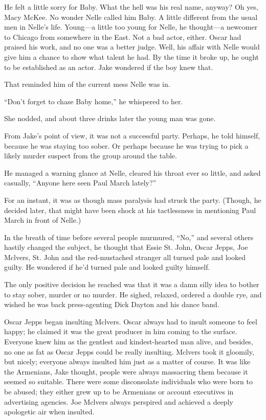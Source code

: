 \documentclass{novel}
\begin{document}
He felt a little sorry for Baby. What the hell was his real name, anyway? Oh yes, Macy McKee. No wonder Nelle called him Baby. A little different from the usual men in Nelle’s life. Young—a little too young for Nelle, he thought—a newcomer to Chicago from somewhere in the East. Not a bad actor, either. Oscar had praised his work, and no one was a better judge. Well, his affair with Nelle would give him a chance to show what talent he had. By the time it broke up, he ought to be established as an actor. Jake wondered if the boy knew that.

That reminded him of the current mess Nelle was in.

“Don’t forget to chase Baby home,” he whispered to her.

She nodded, and about three drinks later the young man was gone.

From Jake’s point of view, it was not a successful party. Perhaps, he told himself, because he was staying too sober. Or perhaps because he was trying to pick a likely murder suspect from the group around the table.

He managed a warning glance at Nelle, cleared his throat ever so little, and asked casually, “Anyone here seen Paul March lately?”

For an instant, it was as though mass paralysis had struck the party. (Though, he decided later, that might have been shock at his tactlessness in mentioning Paul March in front of Nelle.)

In the breath of time before several people murmured, “No,” and several others hastily changed the subject, he thought that Essie St. John, Oscar Jepps, Joe Mclvers, St. John and the red-mustached stranger all turned pale and looked guilty. He wondered if he’d turned pale and looked guilty himself.

The only positive decision he reached was that it was a damn silly idea to bother to stay sober, murder or no murder. He sighed, relaxed, ordered a double rye, and wished he was back press-agenting Dick Dayton and his dance band.

Oscar Jepps began insulting Mclvers. Oscar always had to insult someone to feel happy; he claimed it was the great producer in him coming to the surface. Everyone knew him as the gentlest and kindest-hearted man alive, and besides, no one as fat as Oscar Jepps could be really insulting. Mclvers took it gloomily, but nicely; everyone always insulted him just as a matter of course. It was like the Armenians, Jake thought, people were always massacring them because it seemed so suitable. There were some disconsolate individuals who were born to be abused; they either grew up to be Armenians or account executives in advertising agencies. Joe Mclvers always perspired and achieved a deeply apologetic air when insulted.
\end{document}
